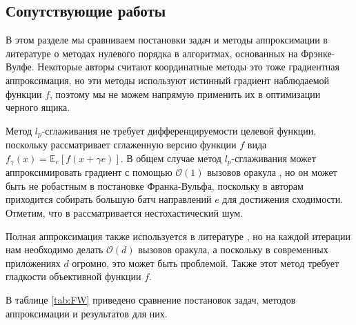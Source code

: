 \subsection{Сопутствующие работы}

    В этом разделе мы сравниваем постановки задач и методы аппроксимации в литературе о методах нулевого порядка в алгоритмах, основанных на Фрэнке-Вулфе. Некоторые авторы считают координатные методы \cite{lacoste2013block} это тоже градиентная аппроксимация, но эти методы используют истинный градиент наблюдаемой функции $f$, поэтому мы не можем напрямую применить их в оптимизации черного ящика.

    Метод $l_p$-сглаживания не требует дифференцируемости целевой функции, поскольку рассматривает сглаженную версию функции $f$ вида $f_{\gamma}(x) = \mathbb{E}_e\left[f(x + \gamma e)\right]$. В общем случае метод $l_p$-сглаживания может аппроксимировать градиент с помощью $\mathcal{O}(1)$ вызовов оракула \cite{dvinskikh2022noisy}, но он может быть не робастным в постановке Франка-Вульфа, поскольку в \cite{lobanov2023zero} авторам приходится собирать большую батч направлений $e$ для достижения сходимости. Отметим, что в \cite{lobanov2023zero} рассматривается нестохастический шум.

    Полная аппроксимация также используется в литературе \cite{sahu2019towards, gao2020can, akhtar2022zeroth}, но на каждой итерации нам необходимо делать $\mathcal{O}(d)$ вызовов оракула, а поскольку в современных приложениях $d$ огромно, это может быть проблемой. Также этот метод требует гладкости объективной функции $f$.

    В таблице \ref{tab:FW} приведено сравнение постановок задач, методов аппроксимации и результатов для них.
    
